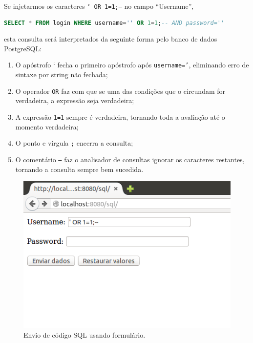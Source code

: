 \begin{frame}[fragile]{}

Se injetarmos os caracteres {\tt ` OR 1=1;--} no campo ``Username'',

\begin{lstlisting}[language=SQL]
SELECT * FROM login WHERE username='' OR 1=1;-- AND password=''
\end{lstlisting}

esta consulta será interpretados da seguinte forma pelo banco de dados
PostgreSQL:

\begin{enumerate}
\item O apóstrofo ` fecha o primeiro apóstrofo após {\tt username='},
  eliminando erro de sintaxe por string não fechada;
\item O operador {\tt OR} faz com que se uma das condições que o
  circundam for verdadeira, a expressão seja verdadeira;\pause
\item A expressão {\tt 1=1} sempre é verdadeira, tornando toda a
  avaliação até o momento verdadeira;
\item O ponto e vírgula {\tt ;} encerra a consulta;\pause
\item O comentário {\tt --} faz o analisador de consultas ignorar os
  caracteres restantes, tornando a consulta sempre bem sucedida.
\end{enumerate}
\end{frame}

\begin{frame}{}
  
  \begin{figure}
    \centering
    \includegraphics[scale=.5]{img/sql-snd.png}
    \caption{Envio de código SQL usando formulário.}
  \end{figure}
\end{frame}

